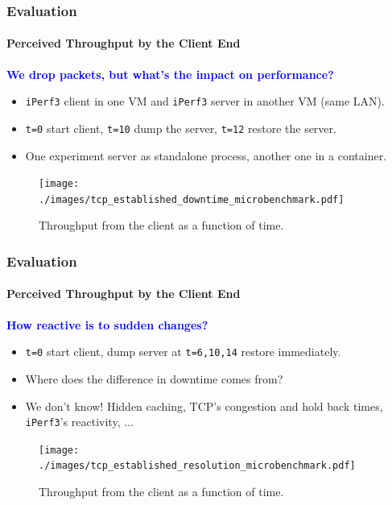 \documentclass[9pt,    %
    english,            %
    xcolor=table,       %
    envcountsect,        %
    aspectratio=169     %
]{beamer}
\begin{document}
\begin{frame}
    \frametitle{Evaluation}
    \framesubtitle{Perceived Throughput by the Client End}

    \vspace{10pt}

    \textbf{\textcolor{blue}{We drop packets, but what's the impact on performance?}}
    \begin{itemize}
        \item \texttt{iPerf3} client in one VM and \texttt{iPerf3} server in another VM (same LAN).
        \item \texttt{t=0} start client, \texttt{t=10} dump the server, \texttt{t=12} restore the server.
        \item One experiment server as standalone process, another one in a container.
    \end{itemize}

    \vspace{-5pt}

    \begin{figure}
        \centering
        \texttt{[image: ./images/tcp\_established\_downtime\_microbenchmark.pdf]}
        \caption{Throughput from the client as a function of time.\label{fig:evaluation-downtime}}
    \end{figure}
    
\end{frame}

\begin{frame}
    \frametitle{Evaluation}
    \framesubtitle{Perceived Throughput by the Client End}

    \vspace{10pt}

    \textbf{\textcolor{blue}{How reactive is to sudden changes?}}
    \begin{itemize}
        \item \texttt{t=0} start client, dump server at \texttt{t=6,10,14} restore immediately.
        \item Where does the difference in downtime comes from?
        \item We don't know! Hidden caching, TCP's congestion and hold back times, \texttt{iPerf3}'s reactivity, ...
    \end{itemize}

    \vspace{-5pt}

    \begin{figure}
        \centering
        \texttt{[image: ./images/tcp\_established\_resolution\_microbenchmark.pdf]}
        \caption{Throughput from the client as a function of time.\label{fig:evaluation-downtime}}
    \end{figure}
    
\end{frame}
\end{document}
